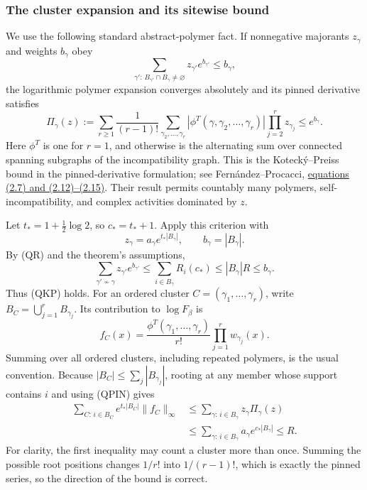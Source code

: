 \subsubsection{The cluster expansion and its sitewise bound}

We use the following standard abstract-polymer fact.  If nonnegative
majorants \(z_\gamma\) and weights \(b_\gamma\) obey
\[
 \sum_{\gamma':\,B_{\gamma'}\cap B_\gamma\ne\varnothing}
     z_{\gamma'}e^{b_{\gamma'}}\le b_\gamma,
 \tag{QKP}
\]
the logarithmic polymer expansion converges absolutely and its pinned
derivative satisfies
\[
 \Pi_\gamma(z):=
 \sum_{r\ge1}\frac1{(r-1)!}
    \sum_{\gamma_2,\ldots,\gamma_r}
    |\phi^T(\gamma,\gamma_2,\ldots,\gamma_r)|
       \prod_{j=2}^r z_{\gamma_j}
 \le e^{b_\gamma}.
 \tag{QPIN}
\]
Here \(\phi^T\) is one for \(r=1\), and otherwise is the alternating
sum over connected spanning subgraphs of the incompatibility graph.
This is the Koteck\'y--Preiss bound in the pinned-derivative formulation;
see Fern\'andez--Procacci,
\href{https://arxiv.org/pdf/math-ph/0605041}{equations (2.7) and
(2.12)--(2.15)}.  Their result permits countably many polymers,
self-incompatibility, and complex activities dominated by \(z\).

Let \(t_*=1+\frac12\log2\), so \(c_*=t_*+1\).  Apply this
criterion with
\[
 z_\gamma=a_\gamma e^{t_*|B_\gamma|},
 \qquad b_\gamma=|B_\gamma|.
\]
By (QR) and the theorem's assumptions,
\[
 \sum_{\gamma'\not\sim\gamma}z_{\gamma'}e^{b_{\gamma'}}
 \le\sum_{i\in B_\gamma}R_i(c_*)
 \le |B_\gamma|R\le b_\gamma.
\]
Thus (QKP) holds.  For an ordered cluster
\(C=(\gamma_1,\ldots,\gamma_r)\), write
\(B_C=\bigcup_{j=1}^r B_{\gamma_j}\).  Its contribution to
\(\log F_\beta\) is
\[
 f_C(x)=\frac{\phi^T(\gamma_1,\ldots,\gamma_r)}{r!}
             \prod_{j=1}^r w_{\gamma_j}(x).
 \tag{QC}
\]
Summing over all ordered clusters, including repeated polymers, is the
usual convention.  Because \(|B_C|\le\sum_j|B_{\gamma_j}|\),
rooting at any member whose support contains \(i\) and using (QPIN)
gives
\begin{align*}
 \sum_{C:\,i\in B_C}e^{t_*|B_C|}\|f_C\|_\infty
 &\le \sum_{\gamma:\,i\in B_\gamma}z_\gamma\Pi_\gamma(z)\\
 &\le \sum_{\gamma:\,i\in B_\gamma}
               a_\gamma e^{c_*|B_\gamma|}
 \le R.
 \tag{QS}
\end{align*}
For clarity, the first inequality may count a cluster more than once.
Summing the possible root positions changes \(1/r!\) into
\(1/(r-1)!\), which is exactly the pinned series, so the direction
of the bound is correct.

